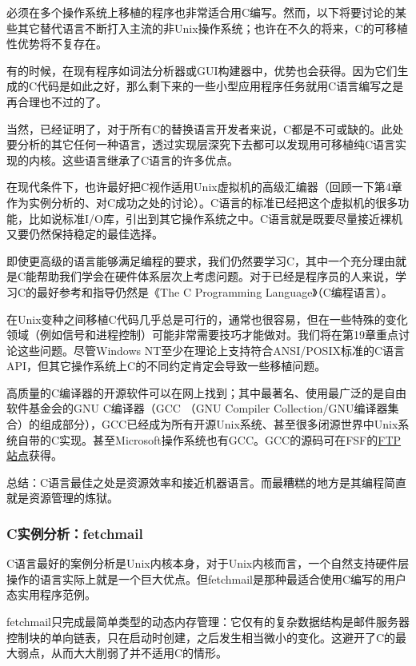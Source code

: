 \documentclass[12pt,oneside]{book}
\begin{document}
\begin{common-format}
必须在多个操作系统上移植的程序也非常适合用C编写。然而，以下将要讨论的某些其它替代语言不断打入主流的非Unix操作系统；也许在不久的将来，C的可移植性优势将不复存在。

有的时候，在现有程序如词法分析器或GUI构建器中，优势也会获得。因为它们生成的C代码是如此之好，那么剩下来的一些小型应用程序任务就用C语言编写之是再合理也不过的了。

当然，已经证明了，对于所有C的替换语言开发者来说，C都是不可或缺的。此处要分析的其它任何一种语言，透过实现层深究下去都可以发现用可移植纯C语言实现的内核。这些语言继承了C语言的许多优点。

在现代条件下，也许最好把C视作适用Unix虚拟机的高级汇编器（回顾一下第4章作为实例分析的、对C成功之处的讨论）。C语言的标准已经把这个虚拟机的很多功能，比如说标准I/O库，引出到其它操作系统之中。C语言就是既要尽量接近裸机又要仍然保持稳定的最佳选择。

即使更高级的语言能够满足编程的要求，我们仍然要学习C，其中一个充分理由就是C能帮助我们学会在硬件体系层次上考虑问题。对于已经是程序员的人来说，学习C的最好参考和指导仍然是《The C Programming Language》（C编程语言）\cite{Kernighan-Ritchie}。

在Unix变种之间移植C代码几乎总是可行的，通常也很容易，但在一些特殊的变化领域（例如信号和进程控制）可能非常需要技巧才能做对。我们将在第19章重点讨论这些问题。尽管Windows NT至少在理论上支持符合ANSI/POSIX标准的C语言API，但其它操作系统上C的不同约定肯定会导致一些移植问题。

高质量的C编译器的开源软件可以在网上找到；其中最著名、使用最广泛的是自由软件基金会的GNU C编译器（GCC （GNU Compiler Collection/GNU编译器集合）的组成部分），GCC已经成为所有开源Unix系统、甚至很多闭源世界中Unix系统自带的C实现。甚至Microsoft操作系统也有GCC。GCC的源码可在FSF的\href{Kernighan-Ritchie}{FTP站点}获得。

总结：C语言最佳之处是资源效率和接近机器语言。而最糟糕的地方是其编程简直就是资源管理的炼狱。


\subsubsection{C实例分析：fetchmail}
C语言最好的案例分析是Unix内核本身，对于Unix内核而言，一个自然支持硬件层操作的语言实际上就是一个巨大优点。但fetchmail是那种最适合使用C编写的用户态实用程序范例。

fetchmail只完成最简单类型的动态内存管理：它仅有的复杂数据结构是邮件服务器控制块的单向链表，只在启动时创建，之后发生相当微小的变化。这避开了C的最大弱点，从而大大削弱了并不适用C的情形。


\end{common-format}
\end{document}
